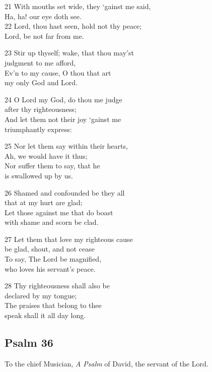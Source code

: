 21 With mouths set wide, they ‘gainst me said,\\
Ha, ha! our eye doth see.\\
22 Lord, thou hast seen, hold not thy peace;\\
Lord, be not far from me.

23 Stir up thyself; wake, that thou may’st\\
judgment to me afford,\\
Ev’n to my cause, O thou that art\\
my only God and Lord.

24 O Lord my God, do thou me judge\\
after thy righteousness;\\
And let them not their joy ‘gainst me\\
triumphantly express:

25 Nor let them say within their hearts,\\
Ah, we would have it thus;\\
Nor suffer them to say, that he\\
is swallowed up by us.

26 Shamed and confounded be they all\\
that at my hurt are glad;\\
Let those against me that do boast\\
with shame and scorn be clad.

27 Let them that love my righteous cause\\
be glad, shout, and not cease\\
To say, The Lord be magnified,\\
who loves his servant’s peace.

28 Thy righteousness shall also be\\
declared by my tongue;\\
The praises that belong to thee\\
speak shall it all day long.

\begin{center}
\quad{}\quad{}
\end{center}

\subsection*{Psalm 36 }

To the chief Musician,
\emph{A Psalm} of David, the servant of the Lord.

